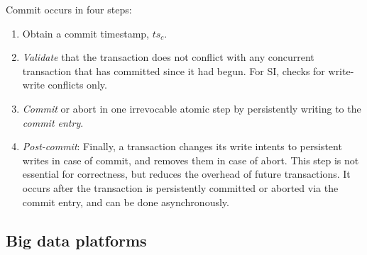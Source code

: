  Commit occurs in four steps: \vspace{-0.3cm}
  \begin{enumerate}
    \setlength{\itemsep}{0pt}
    \setlength{\parskip}{0pt}
    \setlength{\parsep}{2pt}  
  \item
  Obtain a commit timestamp, $ts_c$. 
  \item \emph{Validate} that the transaction does not conflict with any concurrent transaction that has committed since it 
had begun.  For SI, checks for write-write conflicts only. 


\item \emph{Commit} or abort in one  irrevocable atomic step by persistently writing to the \emph{commit entry}. 
  
 \item \emph{Post-commit}: 
  Finally, a transaction changes its write intents to
  persistent writes in case of commit, and removes them in case of abort. This
  step is not essential for correctness, but reduces the overhead of future transactions. It
  occurs after the transaction is persistently committed or aborted via the commit entry, 
  and can be done asynchronously.
 \end{enumerate}
 

\subsection{Big data platforms}
\label{ssec:bigdata}

